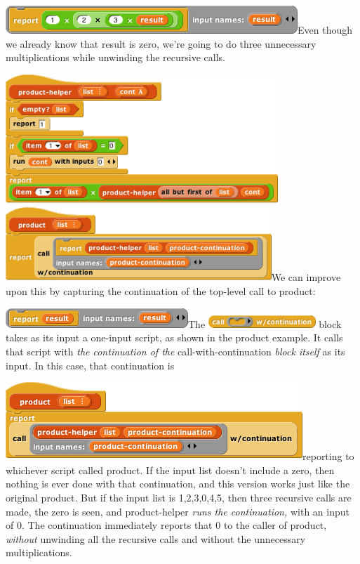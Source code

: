 \includegraphics[width=4.33333in,height=0.41667in]{media/image912.png}Even
though we already know that result is zero, we're going to do three
unnecessary multiplications while unwinding the recursive calls.

\includegraphics[width=4.03819in,height=1.92569in]{media/image913.png}\includegraphics[width=3.94514in,height=1.09792in]{media/image914.png}We
can improve upon this by capturing the continuation of the top-level
call to product:

\includegraphics[width=2.70833in,height=0.29167in]{media/image915.png}The
\includegraphics[width=1.59125in,height=0.18611in]{media/image916.png}
block takes as its input a one-input script, as shown in the product
example. It calls that script with \emph{the continuation of the}
call-with-continuation \emph{block itself} as its input. In this case,
that continuation is

\includegraphics[width=4.40625in,height=1.15625in]{media/image917.png}reporting
to whichever script called product. If the input list doesn't include a
zero, then nothing is ever done with that continuation, and this version
works just like the original product. But if the input list is
1,2,3,0,4,5, then three recursive calls are made, the zero is seen, and
product-helper \emph{runs the continuation,} with an input of 0. The
continuation immediately reports that 0 to the caller of product,
\emph{without} unwinding all the recursive calls and without the
unnecessary multiplications.


